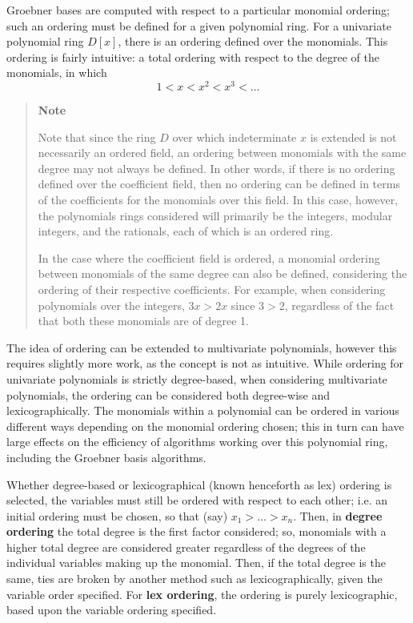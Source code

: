 \documentclass[letterpaper,12pt,titlepage,oneside,final]{book}
\newcounter{notecounter}
\newenvironment{note}{\begin{quote}%
    \refstepcounter{notecounter}%
  \textbf{Note \arabic{notecounter}}%
  \quad
}{%
\end{quote}%
}
\begin{document}
Groebner bases are computed with respect to a particular monomial ordering; such an ordering must be defined for a given polynomial ring.  For a univariate polynomial ring ${D[x]}$, there is an ordering defined over the monomials.  This ordering is fairly intuitive: a total ordering with respect to the degree of the monomials, in which
\begin{equation*}
  1 < x < x^2 < x^3 < \ldots
\end{equation*}

\begin{note}
  Note that since the ring ${D}$ over which indeterminate ${x}$ is extended is not necessarily an ordered field, an ordering between monomials with the same degree may not always be defined.  In other words, if there is no ordering defined over the coefficient field, then no ordering can be defined in terms of the coefficients for the monomials over this field.  In this case, however, the polynomials rings considered will primarily be the integers, modular integers, and the rationals, each of which is an ordered ring.  

  In the case where the coefficient field is ordered, a monomial ordering between monomials of the same degree can also be defined, considering the ordering of their respective coefficients.  For example, when considering polynomials over the integers, ${3x > 2x}$ since ${3 > 2}$, regardless of the fact that both these monomials are of degree 1.
\end{note}

The idea of ordering can be extended to multivariate polynomials, however this requires slightly more work, as the concept is not as intuitive.  While ordering for univariate polynomials is strictly degree-based, when considering multivariate polynomials, the ordering can be considered both degree-wise and lexicographically.  The monomials within a polynomial can be ordered in various different ways depending on the monomial ordering chosen; this in turn can have large effects on the efficiency of algorithms working over this polynomial ring, including the Groebner basis algorithms.

Whether degree-based or lexicographical (known henceforth as lex) ordering is selected, the variables must still be ordered with respect to each other; i.e. an initial ordering must be chosen, so that (say) ${x_1 > \ldots > x_n}$.  Then, in \textbf{degree ordering} the total degree is the first factor considered; so, monomials with a higher total degree are considered greater regardless of the degrees of the individual variables making up the monomial.  Then, if the total degree is the same, ties are broken by another method such as lexicographically, given the variable order specified.  For \textbf{lex ordering}, the ordering is purely lexicographic, based upon the variable ordering specified.
\end{document}
